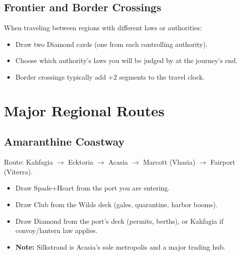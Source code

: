 \subsection{Frontier and Border Crossings}
\label{subsec:frontier-travel}

When traveling between regions with different laws or authorities:
\begin{itemize}
\item Draw two Diamond cards (one from each controlling authority).
\item Choose which authority's laws you will be judged by at the journey's end.
\item Border crossings typically add +2 segments to the travel clock.
\end{itemize}

\section{Major Regional Routes}
\label{sec:regional-routes}

\subsection{Amaranthine Coastway}
\label{subsec:amaranthine-coastway}

Route: Kahfagia $\rightarrow$ Ecktoria $\rightarrow$ Acasia $\rightarrow$ Marcott (Vhasia) $\rightarrow$ Fairport (Viterra).

\begin{itemize}
\item Draw Spade+Heart from the port you are entering.
\item Draw Club from the Wilds deck (gales, quarantine, harbor booms).
\item Draw Diamond from the port's deck (permits, berths), or Kahfagia if convoy/lantern law applies.
\item \textbf{Note:} Silkstrand is Acasia's sole metropolis and a major trading hub.
\end{itemize}

